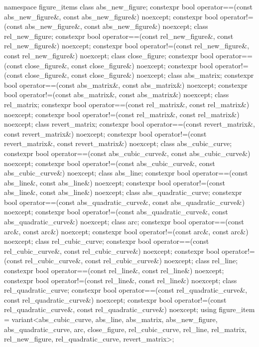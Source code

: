 \begin{codeblock}
{{{{  namespace figure_items {
    class abs_new_figure;
    constexpr bool operator==(const abs_new_figure&, const abs_new_figure&) 
      noexcept;
    constexpr bool operator!=(const abs_new_figure&, const abs_new_figure&) 
      noexcept;
    class rel_new_figure;
    constexpr bool operator==(const rel_new_figure&, const rel_new_figure&) 
      noexcept;
    constexpr bool operator!=(const rel_new_figure&, const rel_new_figure&) 
      noexcept;
    class close_figure;
    constexpr bool operator==(const close_figure&, const close_figure&) noexcept;
    constexpr bool operator!=(const close_figure&, const close_figure&) noexcept;
    class abs_matrix;
    constexpr bool operator==(const abs_matrix&, const abs_matrix&) noexcept;
    constexpr bool operator!=(const abs_matrix&, const abs_matrix&) noexcept;
    class rel_matrix;
    constexpr bool operator==(const rel_matrix&, const rel_matrix&) noexcept;
    constexpr bool operator!=(const rel_matrix&, const rel_matrix&) noexcept;
    class revert_matrix;
    constexpr bool operator==(const revert_matrix&, const revert_matrix&) 
      noexcept;
    constexpr bool operator!=(const revert_matrix&, const revert_matrix&) 
      noexcept;
    class abs_cubic_curve;
    constexpr bool operator==(const abs_cubic_curve&, const abs_cubic_curve&) 
      noexcept;
    constexpr bool operator!=(const abs_cubic_curve&, const abs_cubic_curve&) 
      noexcept;
    class abs_line;
    constexpr bool operator==(const abs_line&, const abs_line&) noexcept;
    constexpr bool operator!=(const abs_line&, const abs_line&) noexcept;
    class abs_quadratic_curve;
    constexpr bool operator==(const abs_quadratic_curve&,
      const abs_quadratic_curve&) noexcept;
    constexpr bool operator!=(const abs_quadratic_curve&,
      const abs_quadratic_curve&) noexcept;
    class arc;
    constexpr bool operator==(const arc&, const arc&) noexcept;
    constexpr bool operator!=(const arc&, const arc&) noexcept;
    class rel_cubic_curve;
    constexpr bool operator==(const rel_cubic_curve&, const rel_cubic_curve&) 
      noexcept;
    constexpr bool operator!=(const rel_cubic_curve&, const rel_cubic_curve&) 
      noexcept;
    class rel_line;
    constexpr bool operator==(const rel_line&, const rel_line&) noexcept;
    constexpr bool operator!=(const rel_line&, const rel_line&) noexcept;
    class rel_quadratic_curve;
    constexpr bool operator==(const rel_quadratic_curve&,
      const rel_quadratic_curve&) noexcept;
    constexpr bool operator!=(const rel_quadratic_curve&,
      const rel_quadratic_curve&) noexcept;
    using figure_item = variant<abs_cubic_curve, abs_line, abs_matrix, 
      abs_new_figure, abs_quadratic_curve, arc, close_figure,
      rel_cubic_curve, rel_line, rel_matrix, rel_new_figure, 
      rel_quadratic_curve, revert_matrix>;
  }
  
}}}}
\end{codeblock}

